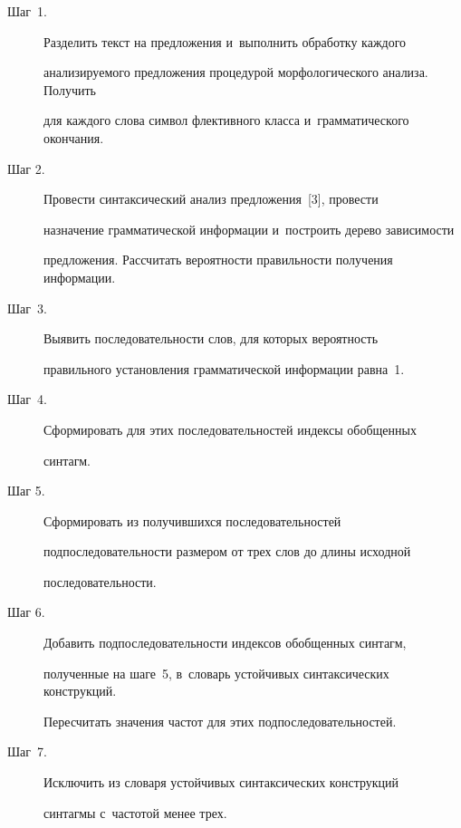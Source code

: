 \begin{description}  

\item[Шаг~1.] Разделить текст на предложения и~выполнить обработку каждого 

анализируемого предложения процедурой морфологического анализа. Получить 

для каждого слова символ флективного класса и~грамматического окончания.

  

\item[Шаг 2.] Провести синтаксический анализ предложения~[3], провести 

назначение грамматической информации и~построить дерево зависимости 

предложения. Рассчитать вероятности правильности получения информации. 

  

\item[Шаг~3.] Выявить последовательности слов, для которых вероятность 

правильного установления грамматической информации равна~1.

  

\item[Шаг~4.] Сформировать для этих последовательностей индексы обобщенных 

синтагм.

  

\item[Шаг 5.] Сформировать из получившихся последовательностей 

подпоследовательности размером от трех слов до длины исходной 

последовательности.

  

\item[Шаг 6.] Добавить подпоследовательности индексов обобщенных синтагм, 

полученные на шаге~5, в~словарь устойчивых синтаксических конструкций. 

Пересчитать значения частот для этих подпоследовательностей.

  

\item[Шаг~7.] Исключить из словаря устойчивых синтаксических конструкций 

синтагмы с~частотой менее трех.

\end{description}



